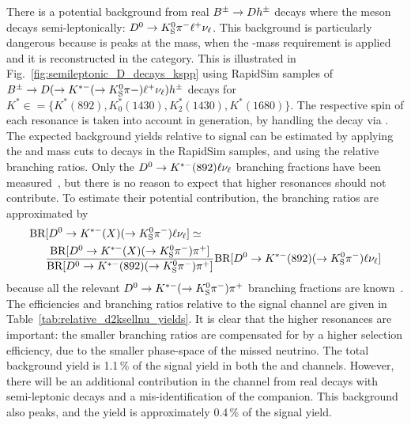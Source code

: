 There is a potential background from real ${{B}^\pm}\rightarrow{\ensuremath{D}} h^\pm$ decays where the \D meson decays semi-leptonically: ${{D}^0}\rightarrow{\ensuremath{{K}^0_{\mathrm{S}}}}{\ensuremath{{\pi}^-}}\ell^+\nu_\ell$. This background is particularly dangerous because is peaks at the \B mass, when the \D-mass requirement is applied and it is reconstructed in the \DtoKspipi category. This is illustrated in Fig.~\ref{fig:semileptonic_D_decays_kspp} using RapidSim samples of ${{B}^\pm}\rightarrow{\ensuremath{D}}(\rightarrow K^{*-}(\rightarrow {\ensuremath{{K}^0_{\mathrm{S}}}}\pi-)\ell^+\nu_\ell)h^\pm $ decays for $K^{*}\in=\{K^*(892), K^*_0(1430), K^*_2(1430), K^*(1680)\}$. The respective spin of each resonance is taken into account in generation, by handling the decay via \evtgen. The expected background yields relative to signal can be estimated by applying the \B and \D mass cuts to decays in the RapidSim samples, and using the relative branching ratios. Only the ${{D}^0}\rightarrow{\ensuremath{{K}^{*-}}}(892)\ell\nu_\ell$ branching fractions have been measured~\cite{PDG2020}, but there is no reason to expect that higher \Kstar resonances should not contribute. To estimate their potential contribution, the branching ratios are approximated by
\begin{align*}
    \text{BR}&[{{D}^0}\rightarrow{\ensuremath{{K}^{*-}}}(X)(\rightarrow{\ensuremath{{K}^0_{\mathrm{S}}}}{\ensuremath{{\pi}^-}})\ell\nu_\ell] \simeq\\& \frac{\text{BR}[{{D}^0}\rightarrow{\ensuremath{{K}^{*-}}}(X)(\rightarrow{\ensuremath{{K}^0_{\mathrm{S}}}}{\ensuremath{{\pi}^-}}){{\pi}^+}] }{\text{BR}[{{D}^0}\rightarrow{\ensuremath{{K}^{*-}}}(892)(\rightarrow{\ensuremath{{K}^0_{\mathrm{S}}}}{\ensuremath{{\pi}^-}}){{\pi}^+}] }\text{BR}[{{D}^0}\rightarrow{\ensuremath{{K}^{*-}}}(892)(\rightarrow{\ensuremath{{K}^0_{\mathrm{S}}}}{\ensuremath{{\pi}^-}})\ell\nu_\ell] 
\end{align*}
because all the relevant ${{D}^0}\rightarrow{\ensuremath{{K}^{*-}}}(\rightarrow{\ensuremath{{K}^0_{\mathrm{S}}}}{\ensuremath{{\pi}^-}}){{\pi}^+}$ branching fractions are known~\cite{PDG2020
}. The efficiencies and branching ratios relative to the signal channel are given in Table~\ref{tab:relative_d2ksellnu_yields}. It is clear that the higher \Kstar resonances are important: the smaller branching ratios are compensated for by a higher selection efficiency, due to the smaller phase-space of the missed neutrino. The total background yield is 1.1\,\% of the signal yield in both the \BtoDpi and \BtoDK channels. However, there will be an additional contribution in the \BtoDK channel from real \BtoDpi decays with semi-leptonic \D decays and a mis-identification of the companion. This background also peaks, and the yield is approximately 0.4\,\% of the \BtoDK signal yield.

